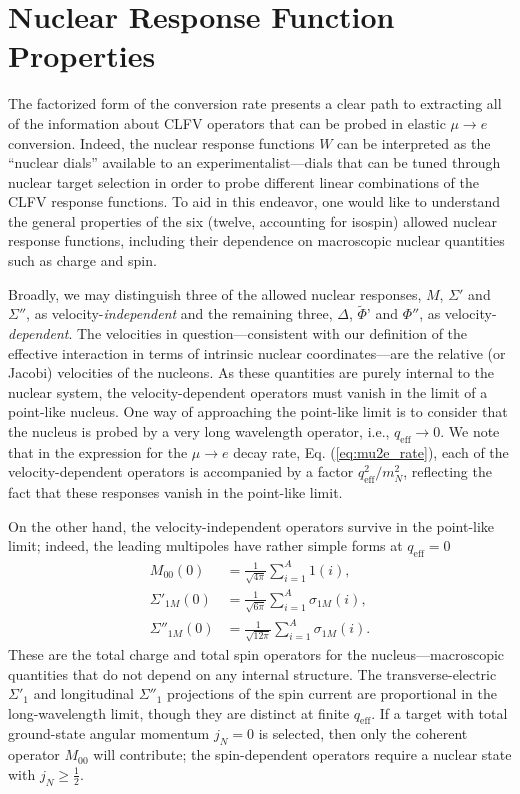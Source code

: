 \documentclass{book}[letterpaper,12pt]
\begin{document}
\chapter{Nuclear Response Function Properties}
\label{chap:nuclear_response}
\thispagestyle{headings}
The factorized form of the conversion rate presents a clear path to extracting all of the information about CLFV operators that can be probed in elastic $\mu\rightarrow e$ conversion. Indeed, the nuclear response functions $W$ can be interpreted as the ``nuclear dials'' available to an experimentalist---dials that can be tuned through nuclear target selection in order to probe different linear combinations of the CLFV response functions. To aid in this endeavor, one would like to understand the general properties of the six (twelve, accounting for isospin) allowed nuclear response functions, including their dependence on macroscopic nuclear quantities such as charge and spin.

Broadly, we may distinguish three of the allowed nuclear responses, $M$, $\Sigma'$ and $\Sigma''$, as velocity-\textit{independent} and the remaining three, $\Delta$, $\tilde{\Phi}$' and $\Phi''$, as velocity-\textit{dependent}. The velocities in question---consistent with our definition of the effective interaction in terms of intrinsic nuclear coordinates---are the relative (or Jacobi) velocities of the nucleons. As these quantities are purely internal to the nuclear system, the velocity-dependent operators must vanish in the limit of a point-like nucleus. One way of approaching the point-like limit is to consider that the nucleus is probed by a very long wavelength operator, i.e., $q_\mathrm{eff}\rightarrow 0$. We note that in the expression for the $\mu\rightarrow e$ decay rate, Eq. (\ref{eq:mu2e_rate}), each of the velocity-dependent operators is accompanied by a factor $q_\mathrm{eff}^2/m_N^2$, reflecting the fact that these responses vanish in the point-like limit. 

On the other hand, the velocity-independent operators survive in the point-like limit; indeed, the leading multipoles have rather simple forms at $q_\mathrm{eff}=0$
\begin{equation}
\begin{split}
M_{00}(0)&=\frac{1}{\sqrt{4\pi}}\sum_{i=1}^A 1(i),\\
\Sigma'_{1M}(0)&=\frac{1}{\sqrt{6\pi}}\sum_{i=1}^A\sigma_{1M}(i),\\
\Sigma''_{1M}(0)&=\frac{1}{\sqrt{12\pi}}\sum_{i=1}^A\sigma_{1M}(i).
\end{split}
\end{equation}
These are the total charge and total spin operators for the nucleus---macroscopic quantities that do not depend on any internal structure. The transverse-electric $\Sigma'_1$ and longitudinal $\Sigma''_1$ projections of the spin current are proportional in the long-wavelength limit, though they are distinct at finite $q_\mathrm{eff}$. If a target with total ground-state angular momentum $j_N=0$ is selected, then only the coherent operator $M_{00}$ will contribute; the spin-dependent operators require a nuclear state with $j_N\geq \frac{1}{2}$. 
\end{document}
